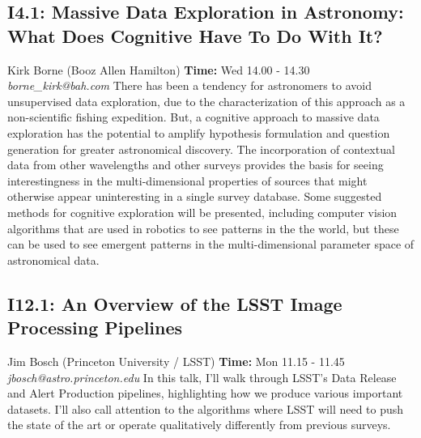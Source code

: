 \documentclass{report}
\begin{document}
\subsection*{I4.1: Massive Data Exploration in Astronomy: What Does Cognitive Have To Do With It?}
\bigskip
Kirk Borne (Booz Allen Hamilton) \newline   \newline   \newline   \newline  \newline  \newline\newline
{\bf Time:} Wed 14.00 - 14.30\newline
\newline
{\it borne\_kirk@bah.com}\newline
\newline\newline
There has been a tendency for astronomers to avoid unsupervised data exploration, due to the characterization of this approach as a non-scientific fishing expedition. But, a cognitive approach to massive data exploration has the potential to amplify hypothesis formulation and question generation for greater astronomical discovery. The incorporation of contextual data from other wavelengths and other surveys provides the basis for seeing interestingness in the multi-dimensional properties of sources that might otherwise appear uninteresting in a single survey database. Some suggested methods for cognitive exploration will be presented, including computer vision algorithms that are used in robotics to see patterns in the the world, but these can be used to see emergent patterns in the multi-dimensional parameter space of astronomical data.\newline
\newpage
\subsection*{I12.1: An Overview of the LSST Image Processing Pipelines}
\bigskip
Jim Bosch (Princeton University / LSST) \newline   \newline   \newline   \newline  \newline  \newline\newline
{\bf Time:} Mon 11.15 - 11.45\newline
\newline
{\it jbosch@astro.princeton.edu}\newline
\newline\newline
In this talk, I'll walk through LSST's Data Release and Alert Production pipelines, highlighting how we produce various important datasets.  I'll also call attention to the algorithms where LSST will need to push the state of the art or operate qualitatively differently from previous surveys.\newline
\newpage
\end{document}
